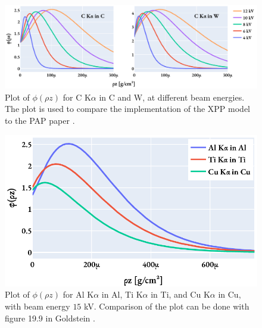 \begin{figure}[htbp]
    \centering
    \includegraphics[width=0.9\linewidth]{figures/discussion/PAP_phi_of_rhoz_C_Ka.pdf}
    \caption{
        Plot of $\phi(\rho z)$ for C K$\alpha$ in C and W, at different beam energies.
        The plot is used to compare the implementation of the XPP model to the PAP paper \cite[Fig. 1 and 2]{pap_1991}.
    }
    \label{fig:discussion:pap:phi_of_rhoz_C_Ka}
\end{figure}



\begin{figure}[htbp]
    \centering
    \includegraphics[width=0.6\linewidth]{figures/discussion/PAP_phi_of_rhoz_Goldstein.pdf}
    \caption{
        Plot of $\phi(\rho z)$ for Al K$\alpha$ in Al, Ti K$\alpha$ in Ti, and Cu K$\alpha$ in Cu, with beam energy $15$ kV.
        Comparison of the plot can be done with figure 19.9 in Goldstein \cite[Fig. 19.9]{goldstein_scanning_2018}.
    }
    \label{fig:discussion:pap:phi_of_rhoz_Goldstein}
\end{figure}




